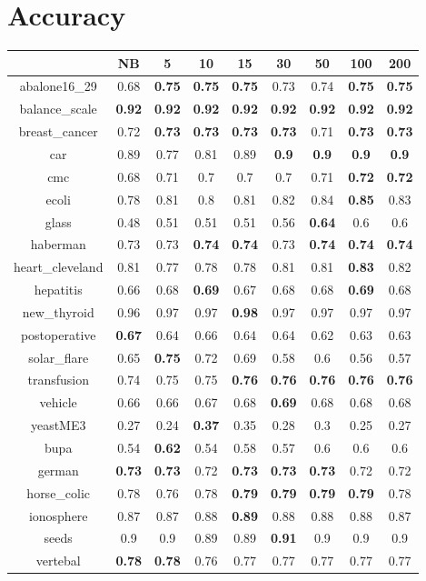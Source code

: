 \documentclass{article}%
\begin{document}
%
\normalsize%
\section*{Accuracy}%
\begin{tabular}{c|cccccccc}%
\hline%
&NB&5&10&15&30&50&100&200\\%
\hline%
abalone16\_29&0.68&\textbf{0.75}&\textbf{0.75}&\textbf{0.75}&0.73&0.74&\textbf{0.75}&\textbf{0.75}\\%
\hline%
balance\_scale&\textbf{0.92}&\textbf{0.92}&\textbf{0.92}&\textbf{0.92}&\textbf{0.92}&\textbf{0.92}&\textbf{0.92}&\textbf{0.92}\\%
\hline%
breast\_cancer&0.72&\textbf{0.73}&\textbf{0.73}&\textbf{0.73}&\textbf{0.73}&0.71&\textbf{0.73}&\textbf{0.73}\\%
\hline%
car&0.89&0.77&0.81&0.89&\textbf{0.9}&\textbf{0.9}&\textbf{0.9}&\textbf{0.9}\\%
\hline%
cmc&0.68&0.71&0.7&0.7&0.7&0.71&\textbf{0.72}&\textbf{0.72}\\%
\hline%
ecoli&0.78&0.81&0.8&0.81&0.82&0.84&\textbf{0.85}&0.83\\%
\hline%
glass&0.48&0.51&0.51&0.51&0.56&\textbf{0.64}&0.6&0.6\\%
\hline%
haberman&0.73&0.73&\textbf{0.74}&\textbf{0.74}&0.73&\textbf{0.74}&\textbf{0.74}&\textbf{0.74}\\%
\hline%
heart\_cleveland&0.81&0.77&0.78&0.78&0.81&0.81&\textbf{0.83}&0.82\\%
\hline%
hepatitis&0.66&0.68&\textbf{0.69}&0.67&0.68&0.68&\textbf{0.69}&0.68\\%
\hline%
new\_thyroid&0.96&0.97&0.97&\textbf{0.98}&0.97&0.97&0.97&0.97\\%
\hline%
postoperative&\textbf{0.67}&0.64&0.66&0.64&0.64&0.62&0.63&0.63\\%
\hline%
solar\_flare&0.65&\textbf{0.75}&0.72&0.69&0.58&0.6&0.56&0.57\\%
\hline%
transfusion&0.74&0.75&0.75&\textbf{0.76}&\textbf{0.76}&\textbf{0.76}&\textbf{0.76}&\textbf{0.76}\\%
\hline%
vehicle&0.66&0.66&0.67&0.68&\textbf{0.69}&0.68&0.68&0.68\\%
\hline%
yeastME3&0.27&0.24&\textbf{0.37}&0.35&0.28&0.3&0.25&0.27\\%
\hline%
bupa&0.54&\textbf{0.62}&0.54&0.58&0.57&0.6&0.6&0.6\\%
\hline%
german&\textbf{0.73}&\textbf{0.73}&0.72&\textbf{0.73}&\textbf{0.73}&\textbf{0.73}&0.72&0.72\\%
\hline%
horse\_colic&0.78&0.76&0.78&\textbf{0.79}&\textbf{0.79}&\textbf{0.79}&\textbf{0.79}&0.78\\%
\hline%
ionosphere&0.87&0.87&0.88&\textbf{0.89}&0.88&0.88&0.88&0.87\\%
\hline%
seeds&0.9&0.9&0.89&0.89&\textbf{0.91}&0.9&0.9&0.9\\%
\hline%
vertebal&\textbf{0.78}&\textbf{0.78}&0.76&0.77&0.77&0.77&0.77&0.77\\%
\hline%
\end{tabular}
\end{document}
